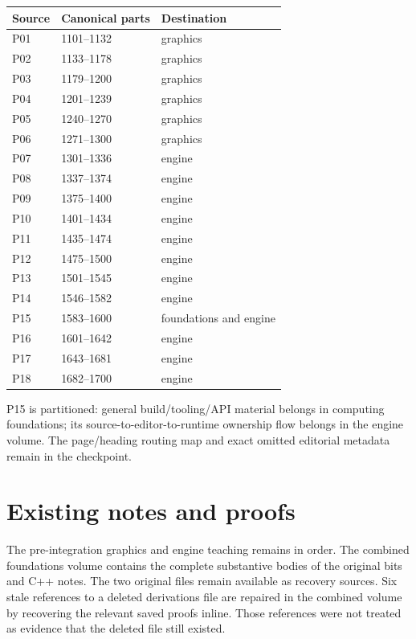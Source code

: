 {\def\LTcaptype{none} %
\begin{longtable}[]{@{}lll@{}}
\toprule\noalign{}
Source & Canonical parts & Destination \\
\midrule\noalign{}
\endhead
\bottomrule\noalign{}
\endlastfoot
P01 & 1101--1132 & graphics \\
P02 & 1133--1178 & graphics \\
P03 & 1179--1200 & graphics \\
P04 & 1201--1239 & graphics \\
P05 & 1240--1270 & graphics \\
P06 & 1271--1300 & graphics \\
P07 & 1301--1336 & engine \\
P08 & 1337--1374 & engine \\
P09 & 1375--1400 & engine \\
P10 & 1401--1434 & engine \\
P11 & 1435--1474 & engine \\
P12 & 1475--1500 & engine \\
P13 & 1501--1545 & engine \\
P14 & 1546--1582 & engine \\
P15 & 1583--1600 & foundations and engine \\
P16 & 1601--1642 & engine \\
P17 & 1643--1681 & engine \\
P18 & 1682--1700 & engine \\
\end{longtable}
}

P15 is partitioned: general build/tooling/API material belongs in computing foundations; its source-to-editor-to-runtime ownership flow belongs in the engine volume. The page/heading routing map and exact omitted editorial metadata remain in the checkpoint.

\section{Existing notes and proofs}\label{appendix-3b67654799a2-existing-notes-and-proofs}

The pre-integration graphics and engine teaching remains in order. The combined foundations volume contains the complete substantive bodies of the original bits and C++ notes. The two original files remain available as recovery sources. Six stale references to a deleted derivations file are repaired in the combined volume by recovering the relevant saved proofs inline. Those references were not treated as evidence that the deleted file still existed.

